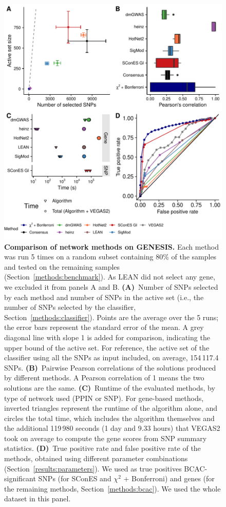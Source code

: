\documentclass[10pt,letterpaper]{article}
\begin{document}
\begin{figure}[!ht]
  \centering
  \includegraphics[width=.8\linewidth]{./figures/figure_3.pdf}
  \caption{\textbf{Comparison of network methods on GENESIS.} Each method was run 5 times on a random subset containing 80\% of the samples and tested on the remaining samples (Section~\ref{methods:benchmark}). As LEAN did not select any gene, we excluded it from panels A and B. \textbf{(A)}~Number of SNPs selected by each method and number of SNPs in the active set (i.e., the number of SNPs selected by the classifier, Section~\ref{methods:classifier}). Points are the average over the 5 runs; the error bars represent the standard error of the mean. A grey diagonal line with slope 1 is added for comparison, indicating the upper bound of the active set. For reference, the active set of the classifier using all the SNPs as input included, on average, 154\,117.4 SNPs. \textbf{(B)}~Pairwise Pearson correlations of the solutions produced by different methods. A Pearson correlation of 1 means the two solutions are the same. \textbf{(C)}~Runtime of the evaluated methods, by type of network used (PPIN or SNP). For gene-based methods, inverted triangles represent the runtime of the algorithm alone, and circles the total time, which includes the algorithm themselves and the additional 119\,980 seconds (1 day and 9.33 hours) that VEGAS2 took on average to compute the gene scores from SNP summary statistics. \textbf{(D)}~True positive rate and false positive rate of the methods, obtained using different parameter combinations (Section~\ref{results:parameters}). We used as true positives BCAC-significant SNPs (for SConES and $\chi^2$ + Bonferroni) and genes (for the remaining methods, Section~\ref{methods:bcac}). We used the whole dataset in this panel.}
  \label{fig:benchmark}
  \end{figure}
\end{document}
